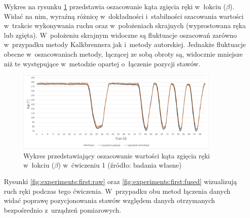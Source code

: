 Wykres na rysunku \ref{fig:experiments:first:angle} przedstawia oszacowanie kąta zgięcia ręki w~łokciu ($\beta$). Widać na nim, wyraźną różnicę w~dokładności i~stabilności szacowania wartości w~trakcie wykonywania ruchu oraz w~położeniach skrajnych (wyprostowana ręka lub zgięta). W~położeniu skrajnym widoczne są fluktuacje oszacowań zarówno w~przypadku metody Kalkbrennera jak i~metody autorskiej. Jednakże fluktuacje obecne w~oszacowaniach metody, łączącej ze sobą obroty są, widocznie mniejsze niż te występujące w~metodzie opartej o~łączenie pozycji stawów.
			
\begin{figure}[!htb]
	\centering
	\includegraphics[width=0.9\textwidth]{images/100/angle.png}
	\caption{Wykres przedstawiający oszacowanie wartości kąta zgięcia ręki w~łokciu ($\beta$) w~ćwiczeniu 1 (źródło: badania własne)}
	\label{fig:experiments:first:angle}
\end{figure}
												
Rysunki \ref{fig:experiments:first:raw} oraz \ref{fig:experiments:first:fused} wizualizują ruch ręki podczas tego ćwiczenia. W~przypadku obu metod łączenia danych widać poprawę pozycjonowania stawów względem danych otrzymanych bezpośrednio z~urządzeń pomiarowych. 
					
